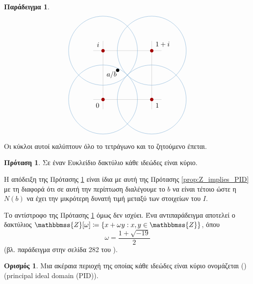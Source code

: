 \documentclass[12pt,a4paper,reqno]{amsart}
\makeatletter
\theoremstyle{definition}
\newtheorem{proposition}[theorem]{Πρόταση}
\newtheorem{definition}[theorem]{Ορισμός}
\newtheorem{example}[theorem]{Παράδειγμα}
\theoremstyle{remark}
\numberwithin{theorem}{section}
\numberwithin{exercise}{section}
\numberwithin{equation}{section}
\newcommand{\ZZ}{\mathbbmss{Z}}
\newcommand{\defn}[1]{{\color{mylightblue}{#1}}}
\def\mathcolor#1#{\@mathcolor{#1}}
\def\@mathcolor#1#2#3{%
  \protect\leavevmode
  \begingroup
    \color#1{#2}#3%
  \endgroup
}
\makeatother
\begin{document}
\begin{example}
    \[
    \begin{tikzpicture}[scale=2.5]
        \draw[step=1cm,gray,very thin] (0.8,0.8) grid (2.2,2.2);
        \fill[darkcandyapplered](1, 1) circle (1pt) node[below left=2pt]{$\mathcolor{black}{0}$};
        \fill[darkcandyapplered](2, 1) circle (1pt) node[below right=2pt]{$\mathcolor{black}{1}$};
        \fill[darkcandyapplered](1, 2) circle (1pt) node[above left=2pt]{$\mathcolor{black}{i}$};
        \fill[darkcandyapplered](2, 2) circle (1pt) node[above right=2pt]{$\mathcolor{black}{1+i}$};
        \fill(1.3, 1.6) circle (1pt) node[below left=-2pt]{$a/b$};
        \draw[iceberg] (1, 1) circle [radius=0.7071];
        \draw[iceberg] (2, 1) circle [radius=0.7071];
        \draw[iceberg] (1, 2) circle [radius=0.7071];
        \draw[iceberg] (2, 2) circle [radius=0.7071];
    \end{tikzpicture}
    \]
    Οι κύκλοι αυτοί καλύπτουν όλο το τετράγωνο και το ζητούμενο έπεται.
\end{example}

\begin{proposition}
    \label{prop:ED_implies_PID}
    Σε έναν Ευκλείδιο δακτύλιο κάθε ιδεώδες είναι κύριο.
\end{proposition}

Η απόδειξη της Πρότασης \ref{prop:ED_implies_PID} είναι ίδια με αυτή της Πρότασης \ref{prop:Z_implies_PID} με τη διαφορά ότι σε αυτή την περίπτωση διαλέγουμε το $b$ να είναι τέτοιο ώστε η $N(b)$ να έχει την μικρότερη δυνατή τιμή μεταξύ των στοιχείων του $I$.

Το αντίστροφο της Πρότασης \ref{prop:ED_implies_PID} όμως δεν ισχύει. Ένα αντιπαράδειγμα αποτελεί ο δακτύλιος $\ZZ[\omega] \coloneqq \{x +\omega{y} : x, y \in \ZZ\}$, όπου 
\[
\omega = \frac{1 + \sqrt{-19}}{2}
\]
(βλ. παράδειγμα στην σελίδα 282 του \cite{DF04}).

\begin{definition}
    \label{def:PID}
    Μια ακέραια περιοχή της οποίας κάθε ιδεώδες είναι κύριο ονομάζεται \defn{περιοχή κύριων ιδεωδών} (\defn{ΠΚΙ}) (principal ideal domain (PID)).
\end{definition}
\end{document}
